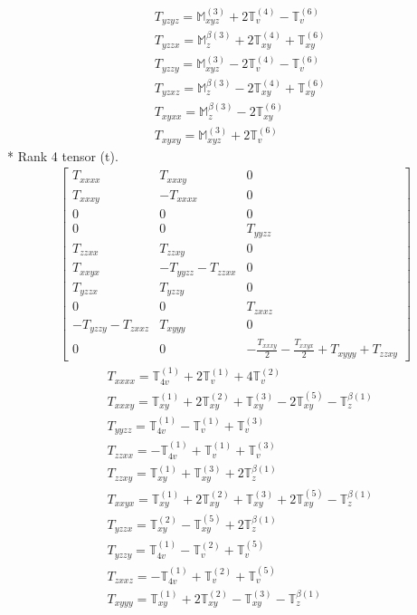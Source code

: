 \documentclass[fleqn,8pt,landscape]{jsarticle}
\begin{document}
\begin{align*}
& T_{yzyz} = \mathbb{M}_{xyz}^{(3)} + 2 \mathbb{T}_{v}^{(4)} - \mathbb{T}_{v}^{(6)} \\
& T_{yzzx} = \mathbb{M}_{z}^{\beta(3)} + 2 \mathbb{T}_{xy}^{(4)} + \mathbb{T}_{xy}^{(6)} \\
& T_{yzzy} = \mathbb{M}_{xyz}^{(3)} - 2 \mathbb{T}_{v}^{(4)} - \mathbb{T}_{v}^{(6)} \\
& T_{yzxz} = \mathbb{M}_{z}^{\beta(3)} - 2 \mathbb{T}_{xy}^{(4)} + \mathbb{T}_{xy}^{(6)} \\
& T_{xyxx} = \mathbb{M}_{z}^{\beta(3)} - 2 \mathbb{T}_{xy}^{(6)} \\
& T_{xyxy} = \mathbb{M}_{xyz}^{(3)} + 2 \mathbb{T}_{v}^{(6)}
\end{align*}
* Rank 4 tensor (t).
\begin{align*}
\begin{bmatrix} T_{xxxx} & T_{xxxy} & 0 \\ T_{xxxy} & - T_{xxxx} & 0 \\ 0 & 0 & 0 \\ 0 & 0 & T_{yyzz} \\ T_{zzxx} & T_{zzxy} & 0 \\ T_{xxyx} & - T_{yyzz} - T_{zzxx} & 0 \\ T_{yzzx} & T_{yzzy} & 0 \\ 0 & 0 & T_{zxxz} \\ - T_{yzzy} - T_{zxxz} & T_{xyyy} & 0 \\ 0 & 0 & - \frac{T_{xxxy}}{2} - \frac{T_{xxyx}}{2} + T_{xyyy} + T_{zzxy} \end{bmatrix}
\end{align*}
\begin{align*}
& T_{xxxx} = \mathbb{T}_{4v}^{(1)} + 2 \mathbb{T}_{v}^{(1)} + 4 \mathbb{T}_{v}^{(2)} \\
& T_{xxxy} = \mathbb{T}_{xy}^{(1)} + 2 \mathbb{T}_{xy}^{(2)} + \mathbb{T}_{xy}^{(3)} - 2 \mathbb{T}_{xy}^{(5)} - \mathbb{T}_{z}^{\beta(1)} \\
& T_{yyzz} = \mathbb{T}_{4v}^{(1)} - \mathbb{T}_{v}^{(1)} + \mathbb{T}_{v}^{(3)} \\
& T_{zzxx} = - \mathbb{T}_{4v}^{(1)} + \mathbb{T}_{v}^{(1)} + \mathbb{T}_{v}^{(3)} \\
& T_{zzxy} = \mathbb{T}_{xy}^{(1)} + \mathbb{T}_{xy}^{(3)} + 2 \mathbb{T}_{z}^{\beta(1)} \\
& T_{xxyx} = \mathbb{T}_{xy}^{(1)} + 2 \mathbb{T}_{xy}^{(2)} + \mathbb{T}_{xy}^{(3)} + 2 \mathbb{T}_{xy}^{(5)} - \mathbb{T}_{z}^{\beta(1)} \\
& T_{yzzx} = \mathbb{T}_{xy}^{(2)} - \mathbb{T}_{xy}^{(5)} + 2 \mathbb{T}_{z}^{\beta(1)} \\
& T_{yzzy} = \mathbb{T}_{4v}^{(1)} - \mathbb{T}_{v}^{(2)} + \mathbb{T}_{v}^{(5)} \\
& T_{zxxz} = - \mathbb{T}_{4v}^{(1)} + \mathbb{T}_{v}^{(2)} + \mathbb{T}_{v}^{(5)} \\
& T_{xyyy} = \mathbb{T}_{xy}^{(1)} + 2 \mathbb{T}_{xy}^{(2)} - \mathbb{T}_{xy}^{(3)} - \mathbb{T}_{z}^{\beta(1)}
\end{align*}
\end{document}
